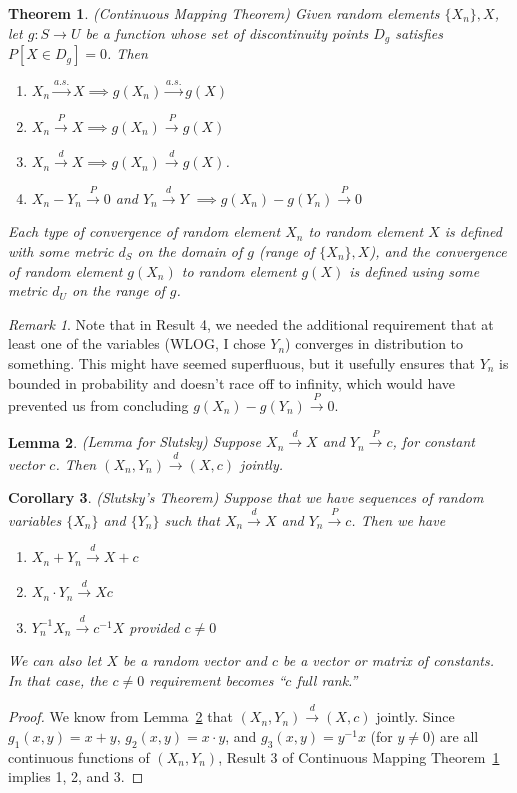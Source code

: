 \documentclass[12pt]{article}
\theoremstyle{plain}
\newtheorem{thm}{Theorem}[section]
\newtheorem{lem}[thm]{Lemma}
\newtheorem{cor}[thm]{Corollary}
\theoremstyle{definition}
\theoremstyle{remark}
\newtheorem*{rmk}{Remark}
\newcommand{\ra}{\rightarrow}
\newcommand{\asto}{\xrightarrow{a.s.}}
\newcommand{\pto}{\xrightarrow{P}}
\newcommand{\dto}{\xrightarrow{d}}
\begin{document}
\begin{thm}\emph{(Continuous Mapping Theorem)}
\label{thm:cmt}
Given random elements $\{X_n\},X$, let $g:S\ra U$ be a function whose
set of discontinuity points $D_g$ satisfies $P[X\in D_g]=0$.
Then
\begin{enumerate}
  \item $X_n\asto X \implies g(X_n) \asto g(X)$
  \item $X_n\pto X \implies g(X_n) \pto g(X)$
  \item $X_n\dto X \implies g(X_n) \dto g(X)$.
  \item $X_n - Y_n\pto 0$ and $Y_n \dto Y$
    $\implies g(X_n) - g(Y_n)\pto 0$

\end{enumerate}
Each type of convergence of random element $X_n$ to random element
$X$ is defined with some metric $d_S$ on the domain of $g$ (range of
$\{X_n\},X$), and the convergence of random element $g(X_n)$
to random element $g(X)$ is defined using some metric $d_U$ on the range
of $g$.
\end{thm}
\begin{rmk}
Note that in Result 4, we needed the additional requirement that at
least one of the variables (WLOG, I chose $Y_n$) converges in
distribution to something.  This might have seemed superfluous, but it
usefully ensures that $Y_n$ is bounded in probability and doesn't race
off to infinity, which would have prevented us from concluding
$g(X_n)-g(Y_n) \pto 0$.
\end{rmk}


\begin{lem}
\label{lem:joint}
\emph{(Lemma for Slutsky)}
Suppose $X_n\dto X$ and $Y_n\pto c$, for constant vector $c$.
Then $(X_n,Y_n)\dto (X,c)$ jointly.
\end{lem}


\begin{cor}{\emph{(Slutsky's Theorem)}}
Suppose that we have sequences of random variables $\{X_n\}$ and
$\{Y_n\}$ such that $X_n \dto X$ and $Y_n \pto c$.
Then we have
\begin{enumerate}
  \item $X_n+Y_n\dto X+c$
  \item $X_n\cdot Y_n\dto Xc$
  \item $Y_n^{-1}X_n\dto c^{-1}X$ provided $c\neq 0$
\end{enumerate}
We can also let $X$ be a random vector and $c$ be a vector or matrix of
constants. In that case, the $c\neq 0$ requirement becomes ``$c$ full
rank.''
\end{cor}
\begin{proof}
We know from Lemma~\ref{lem:joint} that $(X_n,Y_n)\dto (X,c)$ jointly.
Since $g_1(x,y) = x+y$, $g_2(x,y)=x\cdot y$, and $g_3(x,y)=y^{-1}x$
(for $y\neq 0$) are all continuous functions of $(X_n,Y_n)$, Result 3 of
Continuous Mapping Theorem~\ref{thm:cmt} implies 1, 2, and 3.
\end{proof}
\end{document}

